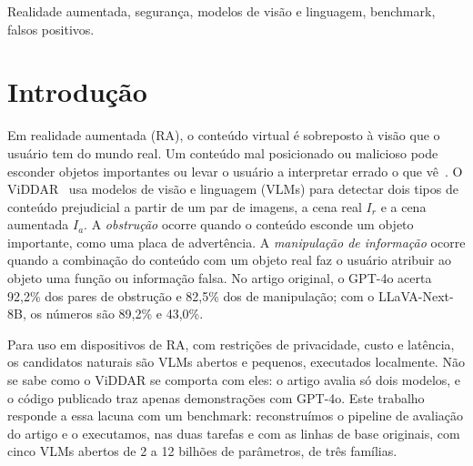 \documentclass[conference]{IEEEtran}
\newcommand{\Ir}{I_r}
\newcommand{\Ia}{I_a}
\begin{document}
\begin{IEEEkeywords}
Realidade aumentada, segurança, modelos de visão e linguagem, benchmark, falsos positivos.
\end{IEEEkeywords}

\section{Introdução}

Em realidade aumentada (RA), o conteúdo virtual é sobreposto à visão que o usuário tem do mundo real.
Um conteúdo mal posicionado ou malicioso pode esconder objetos importantes ou levar o usuário a
interpretar errado o que vê~\cite{roesner2014,arya}. O ViDDAR~\cite{viddar} usa modelos de visão e
linguagem (VLMs) para detectar dois tipos de conteúdo prejudicial a partir de um par de imagens, a cena
real $\Ir$ e a cena aumentada $\Ia$. A \emph{obstrução} ocorre quando o conteúdo esconde um objeto
importante, como uma placa de advertência. A \emph{manipulação de informação} ocorre quando a combinação
do conteúdo com um objeto real faz o usuário atribuir ao objeto uma função ou informação falsa. No
artigo original, o GPT-4o acerta 92,2\% dos pares de obstrução e 82,5\% dos de manipulação; com o
LLaVA-Next-8B, os números são 89,2\% e 43,0\%.

Para uso em dispositivos de RA, com restrições de privacidade, custo e latência, os candidatos naturais
são VLMs abertos e pequenos, executados localmente. Não se sabe como o ViDDAR se comporta com eles: o
artigo avalia só dois modelos, e o código publicado traz apenas demonstrações com GPT-4o. Este trabalho
responde a essa lacuna com um benchmark: reconstruímos o pipeline de avaliação do artigo e o executamos,
nas duas tarefas e com as linhas de base originais, com cinco VLMs abertos de 2 a 12 bilhões de
parâmetros, de três famílias.
\end{document}
